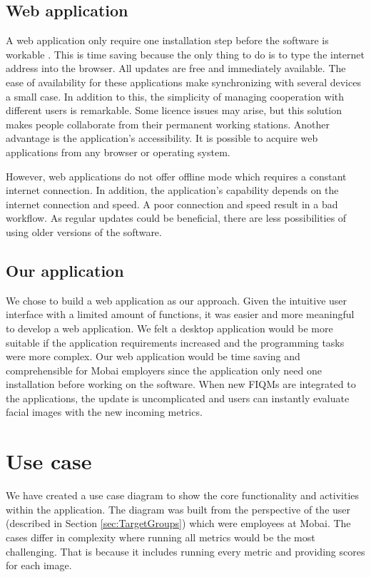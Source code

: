 \subsection*{Web application}
A web application only require one installation step before the software is workable \cite{WebVsDesktop}. This is time saving because the only thing to do is to type the internet address into the browser. All updates are free and immediately available. The ease of availability for these applications make synchronizing with several devices a small case. In addition to this, the simplicity of managing cooperation with different users is remarkable. Some licence issues may arise, but this solution makes people collaborate from their permanent working stations. Another advantage is the application's accessibility. It is possible to acquire web applications from any browser or operating system. 

However, web applications do not offer offline mode which requires a constant internet connection. In addition, the application's capability depends on the internet connection and speed. A poor connection and speed result in a bad workflow. As regular updates could be beneficial, there are less possibilities of using older versions of the software. 

\subsection*{Our application}
We chose to build a web application as our approach. Given the intuitive user interface with a limited amount of functions, it was easier and more meaningful to develop a web application. We felt a desktop application would be more suitable if the application requirements increased and the programming tasks were more complex. Our web application would be time saving and comprehensible for Mobai employers since the application only need one installation before working on the software. When new FIQMs are integrated to the applications, the update is uncomplicated and users can instantly evaluate facial images with the new incoming metrics. 


\section{Use case}
We have created a use case diagram to show the core functionality and activities within the application. The diagram was built from the perspective of the user (described in Section \ref{sec:TargetGroups}) which were employees at Mobai. The cases differ in complexity where running all metrics would be the most challenging. That is because it includes running every metric and providing scores for each image. 

